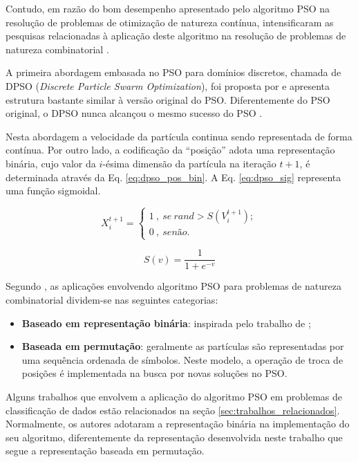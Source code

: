 \documentclass[
	12pt,				%
	openany,			%
	oneside,	
	a4paper,			%
	brazil,				%
	]{unimontes-ppgmsc-abntex2}
\begin{document}
Contudo, em razão do bom desempenho apresentado pelo algoritmo PSO na resolução de problemas de otimização de natureza contínua, intensificaram as pesquisas relacionadas à aplicação deste algoritmo na resolução de problemas de natureza combinatorial \cite{Wang2_2011}. 

A primeira abordagem embasada no PSO para domínios discretos, chamada de DPSO (\textit{Discrete Particle Swarm Optimization}), foi proposta por  e apresenta estrutura bastante similar à versão original do PSO. Diferentemente do PSO original, o DPSO nunca alcançou o mesmo sucesso do PSO \cite{Hoffmann_2011}. 

Nesta abordagem a velocidade da partícula continua sendo representada de forma contínua. Por outro lado, a codificação da ``posição'' adota uma representação binária, cujo valor da $i$-ésima dimensão da partícula na iteração $t+1$, é determinada através da Eq. \ref{eq:dpso_pos_bin}. A Eq. \ref{eq:dpso_sig} representa uma função sigmoidal.

\begin{equation}
\label{eq:dpso_pos_bin}
X^{t+1}_{i} = \left\{\begin{array}{l}
1\ ,\ se\ rand > S(V^{t+1}_{i}); \\
0\ ,\ senão.
\end{array}\right.
\end{equation}

\begin{equation}
\label{eq:dpso_sig}
S(v) = \frac{1}{1 + e^{-v}}
\end{equation}

Segundo , as aplicações envolvendo algoritmo PSO para problemas de natureza combinatorial dividem-se nas seguintes categorias: 

\begin{itemize}
\item \textbf{Baseado em representação binária}: inspirada pelo trabalho de ;
\item \textbf{Baseada em permutação}: geralmente as partículas são representadas por uma sequência ordenada de símbolos. Neste modelo, a operação de troca de posições é implementada na busca por novas soluções no PSO.
\end{itemize}

Alguns trabalhos que envolvem a aplicação do algoritmo PSO em problemas de classificação de dados estão relacionados na seção \ref{sec:trabalhos_relacionados}. Normalmente, os autores adotaram a representação binária na implementação do seu algoritmo, diferentemente da representação desenvolvida neste trabalho que segue a representação baseada em permutação.
\end{document}
